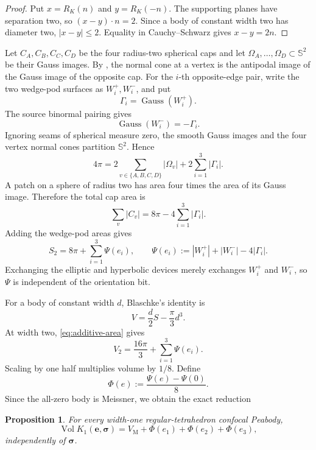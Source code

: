 \documentclass[11pt]{article}
\numberwithin{equation}{section}
\newtheorem{proposition}[theorem]{Proposition}
\theoremstyle{remark}
\newcommand{\Sph}{\mathbb{S}^{2}}
\newcommand{\Vol}{\operatorname{Vol}}
\newcommand{\VM}{V_{\mathrm M}}
\begin{document}
\begin{proof}
Put \(x=R_K(n)\) and \(y=R_K(-n)\). The supporting planes have separation two, so \((x-y)\cdot n=2\). Since a body of constant width two has diameter two, \(|x-y|\le2\). Equality in Cauchy--Schwarz gives \(x-y=2n\).
\end{proof}

Let \(C_A,C_B,C_C,C_D\) be the four radius-two spherical caps and let \(\Omega_A,\ldots,\Omega_D\subset\Sph\) be their Gauss images. By , the normal cone at a vertex is the antipodal image of the Gauss image of the opposite cap. For the \(i\)-th opposite-edge pair, write the two wedge-pod surfaces as \(W_i^+,W_i^-\), and put
\[
  \Gamma_i=\operatorname{Gauss}(W_i^+).
\]
The source binormal pairing gives
\[
  \operatorname{Gauss}(W_i^-)=-\Gamma_i.
\]
Ignoring seams of spherical measure zero, the smooth Gauss images and the four vertex normal cones partition \(\Sph\). Hence
\begin{equation}
  4\pi
  =2\sum_{v\in\{A,B,C,D\}}|\Omega_v|
   +2\sum_{i=1}^3|\Gamma_i|.
  \label{eq:normal-partition}
\end{equation}
A patch on a sphere of radius two has area four times the area of its Gauss image. Therefore the total cap area is
\begin{equation}
  \sum_v|C_v|
  =8\pi-4\sum_{i=1}^3|\Gamma_i|.
  \label{eq:cap-elimination}
\end{equation}
Adding the wedge-pod areas gives
\begin{equation}
  S_2=8\pi+\sum_{i=1}^3\Psi(e_i),
  \qquad
  \Psi(e_i):=|W_i^+|+|W_i^-|-4|\Gamma_i|.
  \label{eq:additive-area}
\end{equation}
Exchanging the elliptic and hyperbolic devices merely exchanges \(W_i^+\) and \(W_i^-\), so \(\Psi\) is independent of the orientation bit.

For a body of constant width \(d\), Blaschke's identity is \cite{ChakerianGroemer1983,AnciauxGuilfoyle2011,Bogosel2023}
\begin{equation}
  V=\frac d2S-\frac\pi3d^3.
  \label{eq:blaschke}
\end{equation}
At width two, \eqref{eq:additive-area} gives
\[
  V_2=\frac{16\pi}{3}+\sum_{i=1}^3\Psi(e_i).
\]
Scaling by one half multiplies volume by \(1/8\). Define
\begin{equation}
  \Phi(e):=\frac{\Psi(e)-\Psi(0)}8.
  \label{eq:phi-def}
\end{equation}
Since the all-zero body is Meissner, we obtain the exact reduction
\begin{proposition}
\label{prop:additive}
For every width-one regular-tetrahedron confocal Peabody,
\begin{equation}
  \Vol K_1(\mathbf e,\boldsymbol\sigma)
  =\VM+\Phi(e_1)+\Phi(e_2)+\Phi(e_3),
  \label{eq:additive-volume}
\end{equation}
independently of \(\boldsymbol\sigma\).
\end{proposition}
\end{document}
